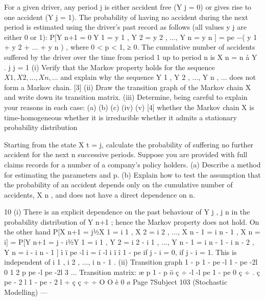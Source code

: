 \documentclass[a4paper,12pt]{article}
\begin{document}
\begin{enumerate} For a given driver, any period j is either accident free (Y j = 0) or gives rise to one
accident (Y j = 1). The probability of having no accident during the next period is
estimated using the driver’s past record as follows (all values y j are either 0 or 1):
P[Y n+1 = 0Y 1 = y 1 , Y 2 = y 2 , ..., Y n = y n ] = pe −\lambda ( y 1 + y 2 + ... + y n ) ,
where 0 < p < 1, \lambda ≥ 0. The cumulative number of accidents suffered by the
driver over the time from period 1 up to period n is
X n =
n
å Y .
j
j = 1
(i) Verify that the Markov property holds for the sequence $X 1 , X 2 , ..., X n , ...$
and explain why the sequence Y 1 , Y 2 , ..., Y n , ... does not form a Markov
chain.
[3]
(ii) Draw the transition graph of the Markov chain X and write down its
transition matrix.
(iii) Determine, being careful to explain your reasons in each case:
(a)
(b)
(c)
(iv)
(v)
[4]
whether the Markov chain X is time-homogeneous
whether it is irreducible
whether it admits a stationary probability distribution 


Starting from the state X t = j, calculate the probability of suffering no
further accident for the next n successive periods. 
Suppose you are provided with full claims records for a number of a
company’s policy holders.
(a) Describe a method for estimating the parameters \lambda and p.
(b) Explain how to test the assumption that the probability of an accident depends only on the cumulative number of accidents, X n ,
and does not have a direct dependence on n.

\newpage

10
(i)
There is an explicit dependence on the past behaviour of Y j , j \leq n in the
probability distribution of Y n+1 ; hence the Markov property does not hold.
On the other hand
P[X n+1 = j1⁄2X 1 = i 1 , X 2 = i 2 , ..., X n - 1 = i n - 1 , X n = i]
= P[Y n+1 = j - i1⁄2Y 1 = i 1 , Y 2 = i 2 - i 1 , ..., Y n - 1 = i n - 1 - i n - 2 , Y n = i - i n - 1 ]
ì ï pe -l i
= í
-l i
ï
î 1 - pe
if j - i = 0,
if j - i = 1.
This is independent of i 1 , i 2 , ..., i n - 1 .
(ii)
Transition graph
1 - p
1 - pe -l
1 - pe -2l
0 1 2
p pe -l pe -2l
3
...
Transition matrix:
æ p 1 - p
ö
ç
÷
-l
-l
pe
1 - pe
0
ç
÷ .
ç
pe - 2 l
1 - pe - 2 l ÷
ç ç
÷ ÷
O
O
è 0
ø
Page 7Subject 103 (Stochastic Modelling) — 


\end{enumerate}
\end{document}
